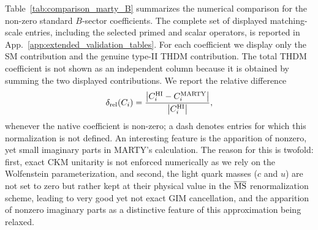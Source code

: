 \documentclass[preprint,11pt]{elsarticle}
\begin{document}
Table~\ref{tab:comparison_marty_B} summarizes the numerical comparison for the non-zero standard \(B\)-sector coefficients.  The complete set of displayed matching-scale entries, including the selected primed and scalar operators, is reported in App.~\ref{app:extended_validation_tables}.  For each coefficient we display only the SM contribution and the genuine type-II THDM contribution.  The total THDM coefficient is not shown as an independent column because it is obtained by summing the two displayed contributions.  We report the relative difference
\begin{equation}
  \delta_{\rm rel}(C_i)=\frac{\left|C_i^{\rm HI}-C_i^{\rm MARTY}\right|}{\left|C_i^{\rm HI}\right|},
  \label{eq:marty_relative_difference}
\end{equation}
whenever the native coefficient is non-zero; a dash denotes entries for which this normalization is not defined. An interesting feature is the apparition of nonzero, yet small imaginary parts in MARTY's calculation. The reason for this is twofold: first, exact CKM unitarity is not enforced numerically as we rely on the Wolfenstein parameterization, and second, the light quark masses ($c$ and $u$) are not set to zero but rather kept at their physical value in the $\overline{\rm MS}$ renormalization scheme, leading to very good yet not exact GIM cancellation, and the apparition of nonzero imaginary parts as a distinctive feature of this approximation being relaxed.
\end{document}
